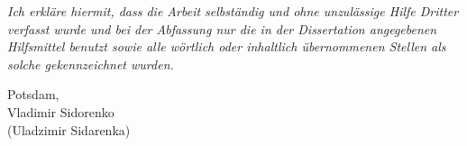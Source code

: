 \vspace*{\fill}

\textit{Ich erkl\"are hiermit, dass die Arbeit selbst\"andig und ohne
  unzul\"assige Hilfe Dritter verfasst wurde und bei der Abfassung nur
  die in der Dissertation angegebenen Hilfsmittel benutzt sowie alle
  w\"ortlich oder inhaltlich \"ubernommenen Stellen als solche
  gekennzeichnet wurden.}

\begin{flushright}
Potsdam, \the\year\\
Vladimir Sidorenko\\
(Uladzimir Sidarenka)
\end{flushright}
\vspace*{\fill}
